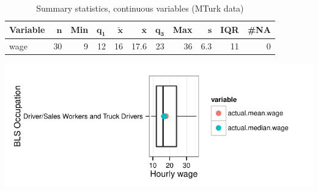 \documentclass[a4paper,10pt]{article}\usepackage[]{graphicx}\usepackage[]{color}
\makeatletter
\def\maxwidth{ %
  \ifdim\Gin@nat@width>\linewidth
    \linewidth
  \else
    \Gin@nat@width
  \fi
}
\makeatother
\begin{document}
\begin{table}[ht]
\centering
{\footnotesize
\begin{tabular}{lrrrrrrrrrr}
 \textbf{Variable} & $\mathbf{n}$ & \textbf{Min} & $\mathbf{q_1}$ & $\mathbf{\widetilde{x}}$ & $\mathbf{\bar{x}}$ & $\mathbf{q_3}$ & \textbf{Max} & $\mathbf{s}$ & \textbf{IQR} & \textbf{\#NA} \\ 
  \hline
wage & 30 & 9 & 12 & 16 & 17.6 & 23 & 36 & 6.3 & 11 & 0 \\ 
  \end{tabular}
}
\caption{Summary statistics, continuous variables (MTurk data)} 
\label{tab2:53-3030}
\end{table}


{\centering \includegraphics[width=\maxwidth]{figure/unnamed-chunk-28} 

}
\end{document}
